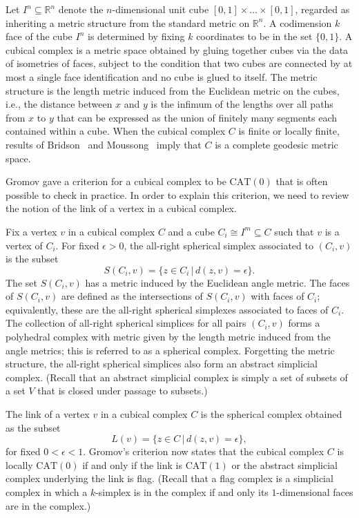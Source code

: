 \documentclass[a4paper,11pt]{article}
\newcommand{\CAT}{\textrm{CAT}}
\begin{document}
Let $I^n \subseteq \mathbb{R}^n$ denote the $n$-dimensional unit cube $[0,1] \times \ldots \times [0,1]$, regarded as inheriting a metric structure from the standard metric on $\mathbb{R}^n$.
A codimension $k$ face of the cube $I^n$ is determined by fixing $k$ coordinates to be in the set $\{0,1\}$.
A cubical complex is a metric space obtained by gluing together cubes via the data of isometries of faces, subject to the condition that two cubes are connected by at most a single face identification and no cube is glued to itself.
The metric structure is the length metric induced from the Euclidean metric on the cubes, i.e., the distance between $x$ and $y$ is the infimum of the lengths over all paths from $x$ to $y$ that can be expressed as the union of finitely many segments each contained within a cube.
When the cubical complex $C$ is finite or locally finite, results of Bridson~\cite{bridson91} and Moussong~\cite{moussong} imply that $C$ is a complete geodesic metric space.

Gromov gave a criterion for a cubical complex to be $\CAT(0)$ that is often possible to check in practice.
In order to explain this criterion, we need to review the notion of the link of a vertex in a cubical complex.

Fix a vertex $v$ in a cubical complex $C$ and a cube $C_i \cong I^m \subseteq C$ such that $v$ is a vertex of $C_i$.
For fixed $\epsilon > 0$, the all-right spherical simplex associated to $(C_i,v)$ is the subset 
\[
S(C_i,v) = \{z \in C_i \, | \, d(z,v) = \epsilon\}.
\]
The set $S(C_i,v)$ has a metric induced by the Euclidean angle metric.
The faces of $S(C_i,v)$ are defined as the intersections of $S(C_i,v)$ with faces of $C_i$; equivalently, these are the all-right spherical simplexes associated to faces of $C_i$.
The collection of all-right spherical simplices for all pairs $(C_i, v)$ forms a polyhedral complex with metric given by the length metric induced from the angle metrics; this is referred to as a spherical complex.
Forgetting the metric structure, the all-right spherical simplices also form an abstract simplicial complex.
(Recall that an abstract simplicial complex is simply a set of subsets of a set $V$ that is closed under passage to subsets.)

The link of a vertex $v$ in a cubical complex $C$ is the spherical complex obtained as the subset  
\[
L(v) = \{z \in C \, | \, d(z,v) = \epsilon\},
\]
for fixed $0 < \epsilon < 1$.
Gromov's criterion now states that the cubical complex $C$ is locally $\CAT(0)$ if and only if the link is $\CAT(1)$ or the abstract simplicial complex underlying the link is flag.
(Recall that a flag complex is a simplicial complex in which a $k$-simplex is in the complex if and only its $1$-dimensional faces are in the complex.)
\end{document}
